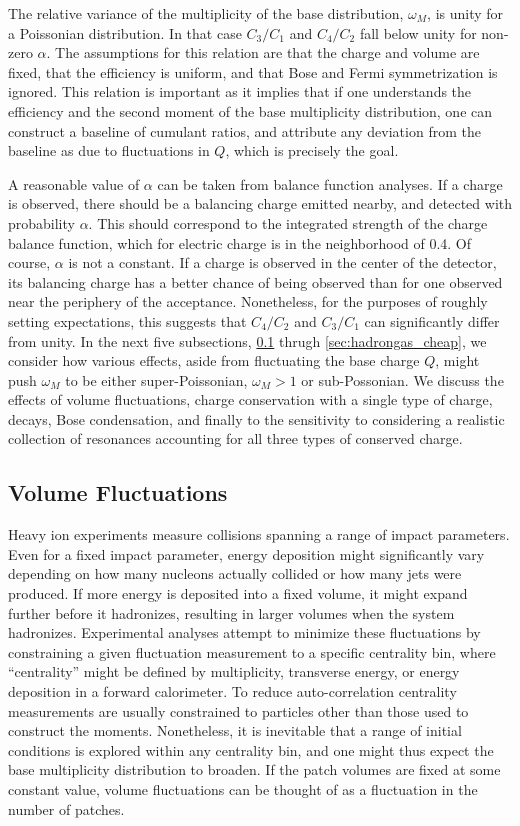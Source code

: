 The relative variance of the multiplicity of the base distribution, $\omega_M$, is unity for a Poissonian distribution. In that case $C_3/C_1$ and $C_4/C_2$ fall below unity for non-zero $\alpha$. The assumptions for this relation are that the charge and volume are fixed, that the efficiency is uniform, and that Bose and Fermi symmetrization is ignored. This relation is important as it implies that if one understands the efficiency and the second moment of the base multiplicity distribution, one can construct a baseline of cumulant ratios, and attribute any deviation from the baseline as due to fluctuations in $Q$, which is precisely the goal.

A reasonable value of $\alpha$ can be taken from balance function analyses. If a charge is observed, there should be a balancing charge emitted nearby, and detected with probability $\alpha$. This should correspond to the integrated strength of the charge balance function, which for electric charge is in the neighborhood of 0.4. Of course, $\alpha$ is not a constant. If a charge is observed in the center of the detector, its balancing charge has a better chance of being observed than for one observed near the periphery of the acceptance. Nonetheless, for the purposes of roughly setting expectations, this suggests that $C_4/C_2$ and $C_3/C_1$ can significantly differ from unity. In the next five subsections, \ref{sec:volumefluc} thrugh \ref{sec:hadrongas_cheap}, we consider how various effects, aside from fluctuating the base charge $Q$, might push $\omega_M$ to be either super-Poissonian, $\omega_M>1$ or sub-Possonian. We discuss the effects of volume fluctuations, charge conservation with a single type of charge, decays, Bose condensation, and finally to the sensitivity to considering a realistic collection of resonances accounting for all three types of conserved charge.

\subsection{Volume Fluctuations}\label{sec:volumefluc}

Heavy ion experiments measure collisions spanning a range of impact parameters. Even for a fixed impact parameter, energy deposition might significantly vary depending on how many nucleons actually collided or how many jets were produced. If more energy is deposited into a fixed volume, it might expand further before it hadronizes, resulting in larger volumes when the system hadronizes. Experimental analyses attempt to minimize these fluctuations by constraining a given fluctuation measurement to a specific centrality bin, where ``centrality'' might be defined by multiplicity, transverse energy, or energy deposition in a forward calorimeter. To reduce auto-correlation centrality measurements are usually constrained to particles other than those used to construct the moments. Nonetheless, it is inevitable that a range of initial conditions is explored within any centrality bin, and one might thus expect the base multiplicity distribution to broaden. If the patch volumes are fixed at some constant value, volume fluctuations can be thought of as a fluctuation in the number of patches. 

